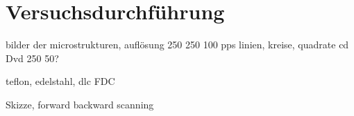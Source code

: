 \section{Versuchsdurchführung}
bilder der microstrukturen, auflösung 250 250 100 pps
linien, kreise, quadrate
cd Dvd
250 50?


teflon, edelstahl, dlc FDC

Skizze, forward backward scanning
